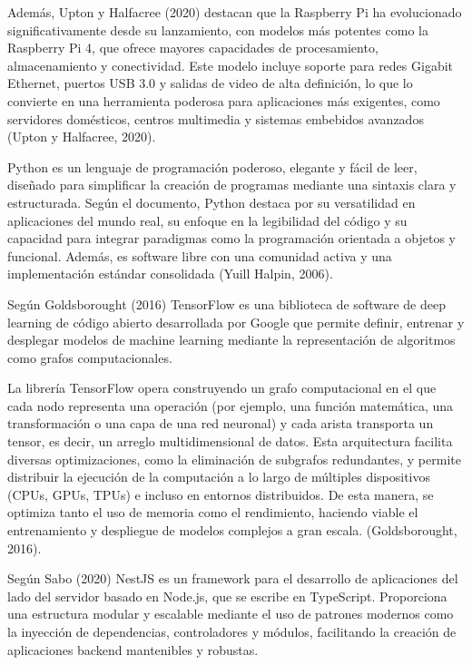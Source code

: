 Además, Upton y Halfacree (2020) destacan que la Raspberry Pi ha evolucionado significativamente desde su lanzamiento, con modelos más potentes como la Raspberry Pi 4, que ofrece mayores capacidades de procesamiento, almacenamiento y conectividad. Este modelo incluye soporte para redes Gigabit Ethernet, puertos USB 3.0 y salidas de video de alta definición, lo que lo convierte en una herramienta poderosa para aplicaciones más exigentes, como servidores domésticos, centros multimedia y sistemas embebidos avanzados (Upton y Halfacree, 2020).


Python es un lenguaje de programación poderoso, elegante y fácil de leer, diseñado para simplificar la creación de programas mediante una sintaxis clara y estructurada. Según el documento, Python destaca por su versatilidad en aplicaciones del mundo real, su enfoque en la legibilidad del código y su capacidad para integrar paradigmas como la programación orientada a objetos y funcional. Además, es software libre con una comunidad activa y una implementación estándar consolidada (Yuill Halpin, 2006).


Según Goldsborought (2016) TensorFlow es una biblioteca de software de deep learning de código abierto desarrollada por Google que permite definir, entrenar y desplegar modelos de machine learning mediante la representación de algoritmos como grafos computacionales.

La librería TensorFlow opera construyendo un grafo computacional en el que cada nodo representa una operación (por ejemplo, una función matemática, una transformación o una capa de una red neuronal) y cada arista transporta un tensor, es decir, un arreglo multidimensional de datos. Esta arquitectura facilita diversas optimizaciones, como la eliminación de subgrafos redundantes, y permite distribuir la ejecución de la computación a lo largo de múltiples dispositivos (CPUs, GPUs, TPUs) e incluso en entornos distribuidos. De esta manera, se optimiza tanto el uso de memoria como el rendimiento, haciendo viable el entrenamiento y despliegue de modelos complejos a gran escala. (Goldsborought, 2016).


Según Sabo (2020) NestJS es un framework para el desarrollo de aplicaciones del lado del servidor basado en Node.js, que se escribe en TypeScript. Proporciona una estructura modular y escalable mediante el uso de patrones modernos como la inyección de dependencias, controladores y módulos, facilitando la creación de aplicaciones backend mantenibles y robustas.

